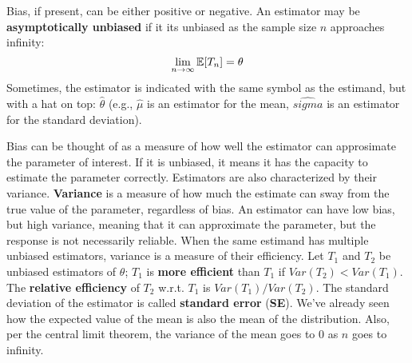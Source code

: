 Bias, if present, can be either positive or negative. An estimator may be \textbf{asymptotically unbiased} if it its unbiased as the sample size $n$ approaches infinity:
\[\lim_{n \to \infty} \mathbb{E}[T_n] = \theta\]
Sometimes, the estimator is indicated with the same symbol as the estimand, but with a hat on top: $\hat{\theta}$ (e.g., $\hat{\mu}$ is an estimator for the mean, $\hat{sigma}$ is an estimator for the standard deviation).

Bias can be thought of as a measure of how well the estimator can approsimate the parameter of interest. If it is unbiased, it means it has the capacity to estimate the parameter correctly. Estimators are also characterized by their variance. \textbf{Variance} is a measure of how much the estimate can sway from the true value of the parameter, regardless of bias. An estimator can have low bias, but high variance, meaning that it can approximate the parameter, but the response is not necessarily reliable. When the same estimand has multiple unbiased estimators, variance is a measure of their efficiency. Let $T_1$ and $T_2$ be unbiased estimators of $\theta$; $T_1$ is \textbf{more efficient} than $T_1$ if $Var(T_2) < Var(T_1)$. The \textbf{relative efficiency} of $T_2$ w.r.t. $T_1$ is $Var(T_1)/Var(T_2)$. The standard deviation of the estimator is called \textbf{standard error} (\textbf{SE}).
We've already seen how the expected value of the mean is also the mean of the distribution. Also, per the central limit theorem, the variance of the mean goes to 0 as $n$ goes to infinity.

